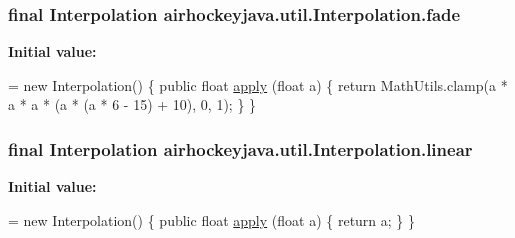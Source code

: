 \subsubsection[{fade}]{\setlength{\rightskip}{0pt plus 5cm}final {\bf Interpolation} airhockeyjava.\+util.\+Interpolation.\+fade\hspace{0.3cm}{\ttfamily [static]}}\label{classairhockeyjava_1_1util_1_1_interpolation_a9bd7861b65b58ba86ff9cff068491e17}
{\bfseries Initial value\+:}
\begin{DoxyCode}
= \textcolor{keyword}{new} Interpolation() \{
        \textcolor{keyword}{public} \textcolor{keywordtype}{float} \hyperlink{classairhockeyjava_1_1util_1_1_interpolation_a21c50444fd69302dcf68703cb0d261ca}{apply} (\textcolor{keywordtype}{float} a) \{
            \textcolor{keywordflow}{return} MathUtils.clamp(a * a * a * (a * (a * 6 - 15) + 10), 0, 1);
        \}
    \}
\end{DoxyCode}
\hypertarget{classairhockeyjava_1_1util_1_1_interpolation_adeb2ff0d35374b31bb39f84594048b5c}{}
\subsubsection[{linear}]{\setlength{\rightskip}{0pt plus 5cm}final {\bf Interpolation} airhockeyjava.\+util.\+Interpolation.\+linear\hspace{0.3cm}{\ttfamily [static]}}\label{classairhockeyjava_1_1util_1_1_interpolation_adeb2ff0d35374b31bb39f84594048b5c}
{\bfseries Initial value\+:}
\begin{DoxyCode}
= \textcolor{keyword}{new} Interpolation() \{
        \textcolor{keyword}{public} \textcolor{keywordtype}{float} \hyperlink{classairhockeyjava_1_1util_1_1_interpolation_a21c50444fd69302dcf68703cb0d261ca}{apply} (\textcolor{keywordtype}{float} a) \{
            \textcolor{keywordflow}{return} a;
        \}
    \}
\end{DoxyCode}
\hypertarget{classairhockeyjava_1_1util_1_1_interpolation_a97bc23a8e964780429495f7f7befa41b}{}
